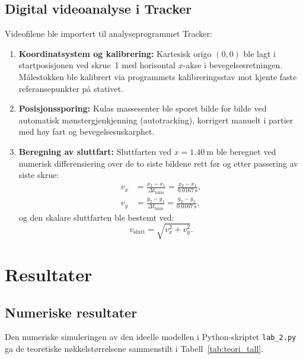 \documentclass[11pt,a4paper]{article}
\begin{document}
\subsection{Digital videoanalyse i Tracker}
Videofilene ble importert til analyseprogrammet Tracker:
\begin{enumerate}
    \item \textbf{Koordinatsystem og kalibrering:} Kartesisk origo $(0,0)$ ble lagt i startposisjonen ved skrue~1 med horisontal $x$-akse i bevegelsesretningen. Målestokken ble kalibrert via programmets kalibreringsstav mot kjente faste referansepunkter på stativet.
    \item \textbf{Posisjonssporing:} Kulas massesenter ble sporet bilde for bilde ved automatisk mønstergjenkjenning (autotracking), korrigert manuelt i partier med høy fart og bevegelsesuskarphet.
    \item \textbf{Beregning av sluttfart:} Sluttfarten ved $x = \SI{1,40}{\meter}$ ble beregnet ved numerisk differensiering over de to siste bildene rett før og etter passering av siste skrue:
    \begin{align}
        v_x &= \frac{x_2 - x_1}{\Delta t_{\text{bilde}}} = \frac{x_2 - x_1}{\SI{0,0167}{\second}}, \label{eq:vx_tracker} \\
        v_y &= \frac{y_2 - y_1}{\Delta t_{\text{bilde}}} = \frac{y_2 - y_1}{\SI{0,0167}{\second}}, \label{eq:vy_tracker}
    \end{align}
    og den skalare sluttfarten ble bestemt ved:
    \begin{equation}
        v_{\text{slutt}} = \sqrt{v_x^2 + v_y^2}.
        \label{eq:vslutt_pyt}
    \end{equation}
\end{enumerate}

\section{Resultater}

\subsection{Numeriske resultater}
Den numeriske simuleringen av den ideelle modellen i Python-skriptet \texttt{lab\_2.py} ga de teoretiske nøkkelstørrelsene sammenstilt i Tabell~\ref{tab:teori_tall}.
\end{document}
